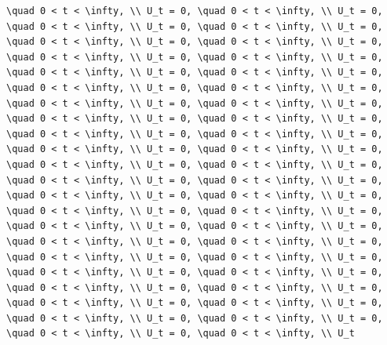\documentclass[
  ukrainian,
]{article}
\begin{document}
\begin{verbatim}
\quad 0 < t < \infty, \\ U_t = 0, \quad 0 < t < \infty, \\ U_t = 0, \quad 0 < t < \infty, \\ U_t = 0, \quad 0 < t < \infty, \\ U_t = 0, \quad 0 < t < \infty, \\ U_t = 0, \quad 0 < t < \infty, \\ U_t = 0, \quad 0 < t < \infty, \\ U_t = 0, \quad 0 < t < \infty, \\ U_t = 0, \quad 0 < t < \infty, \\ U_t = 0, \quad 0 < t < \infty, \\ U_t = 0, \quad 0 < t < \infty, \\ U_t = 0, \quad 0 < t < \infty, \\ U_t = 0, \quad 0 < t < \infty, \\ U_t = 0, \quad 0 < t < \infty, \\ U_t = 0, \quad 0 < t < \infty, \\ U_t = 0, \quad 0 < t < \infty, \\ U_t = 0, \quad 0 < t < \infty, \\ U_t = 0, \quad 0 < t < \infty, \\ U_t = 0, \quad 0 < t < \infty, \\ U_t = 0, \quad 0 < t < \infty, \\ U_t = 0, \quad 0 < t < \infty, \\ U_t = 0, \quad 0 < t < \infty, \\ U_t = 0, \quad 0 < t < \infty, \\ U_t = 0, \quad 0 < t < \infty, \\ U_t = 0, \quad 0 < t < \infty, \\ U_t = 0, \quad 0 < t < \infty, \\ U_t = 0, \quad 0 < t < \infty, \\ U_t = 0, \quad 0 < t < \infty, \\ U_t = 0, \quad 0 < t < \infty, \\ U_t = 0, \quad 0 < t < \infty, \\ U_t = 0, \quad 0 < t < \infty, \\ U_t = 0, \quad 0 < t < \infty, \\ U_t = 0, \quad 0 < t < \infty, \\ U_t = 0, \quad 0 < t < \infty, \\ U_t = 0, \quad 0 < t < \infty, \\ U_t = 0, \quad 0 < t < \infty, \\ U_t = 0, \quad 0 < t < \infty, \\ U_t = 0, \quad 0 < t < \infty, \\ U_t = 0, \quad 0 < t < \infty, \\ U_t = 0, \quad 0 < t < \infty, \\ U_t = 0, \quad 0 < t < \infty, \\ U_t = 0, \quad 0 < t < \infty, \\ U_t = 0, \quad 0 < t < \infty, \\ U_t = 0, \quad 0 < t < \infty, \\ U_t
\end{verbatim}
\end{document}
